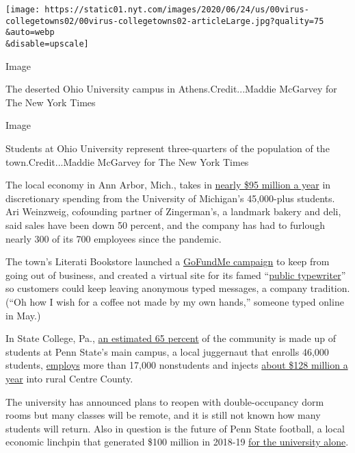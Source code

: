 \texttt{[image: https://static01.nyt.com/images/2020/06/24/us/00virus-collegetowns02/00virus-collegetowns02-articleLarge.jpg?quality=75\\\&auto=webp\\\&disable=upscale]}

Image

The deserted Ohio University campus in Athens.Credit...Maddie McGarvey
for The New York Times

Image

Students at Ohio University represent three-quarters of the population
of the town.Credit...Maddie McGarvey for The New York Times

The local economy in Ann Arbor, Mich., takes in
\href{https://communityrelations.umich.edu/facts-figures/}{nearly \$95
million a year} in discretionary spending from the University of
Michigan's 45,000-plus students. Ari Weinzweig, cofounding partner of
Zingerman's, a landmark bakery and deli, said sales have been down 50
percent, and the company has had to furlough nearly 300 of its 700
employees since the pandemic.

The town's Literati Bookstore launched a
\href{https://www.gofundme.com/f/support-literati-bookstore-amp-booksellers}{GoFundMe
campaign} to keep from going out of business, and created a virtual site
for its famed ``\href{https://www.publictypewriter.com/}{public
typewriter}'' so customers could keep leaving anonymous typed messages,
a company tradition. (``Oh how I wish for a coffee not made by my own
hands,'' someone typed online in May.)

In State College, Pa.,
\href{http://www.statecollegepa.us/DocumentCenter/View/9291/State-College-Neighborhood-Plan-Borough-Wide-Conditions?bidId=}{an
estimated 65 percent} of the community is made up of students at Penn
State's main campus, a local juggernaut that enrolls 46,000 students,
\href{https://factbook.psu.edu/factbook/HrDynamic/EmployeesbyClassificationSummaryPSULaw.aspx?YearCode=2019humors\&FBPlusIndc=N}{employs}
more than 17,000 nonstudents and injects
\href{https://www.psu.edu/ur/newsdocuments/Penn-State_Economic-Contribution-Study_February-2019.pdf}{about
\$128 million a year} into rural Centre County.

The university has announced plans to reopen with double-occupancy dorm
rooms but many classes will be remote, and it is still not known how
many students will return. Also in question is the future of Penn State
football, a local economic linchpin that generated \$100 million in
2018-19
\href{https://www.scribd.com/document/448272170/Penn-State-2018-19-fiscal-year-NCAA-Report-Final\#from_embed?campaign=SkimbitLtd\&ad_group=126006X1587341X3675db3cbb273c0b115aafcc767f8ca5\&keyword=660149026\&source=hp_affiliate\&medium=affiliate}{for
the university alone}.

